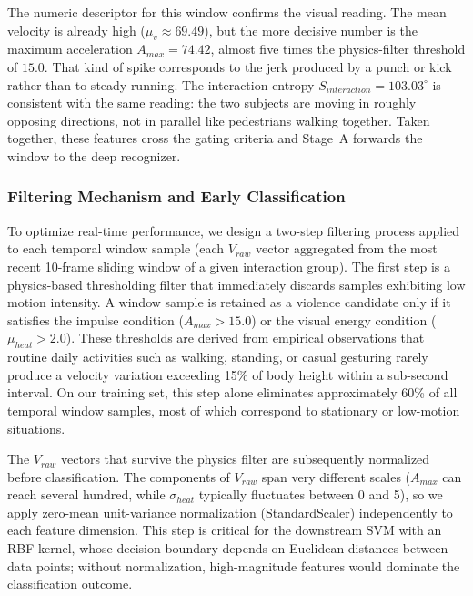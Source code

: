 \documentclass[conference]{IEEEtran}
\begin{document}
The numeric descriptor for this window confirms the visual reading. The mean velocity is already high ($\mu_v \approx 69.49$), but the more decisive number is the maximum acceleration $A_{max} = 74.42$, almost five times the physics-filter threshold of $15.0$. That kind of spike corresponds to the jerk produced by a punch or kick rather than to steady running. The interaction entropy $S_{interaction} = 103.03^\circ$ is consistent with the same reading: the two subjects are moving in roughly opposing directions, not in parallel like pedestrians walking together. Taken together, these features cross the gating criteria and Stage~A forwards the window to the deep recognizer.


\subsubsection{Filtering Mechanism and Early Classification}

To optimize real-time performance, we design a two-step filtering process applied to each temporal window sample (each $V_{raw}$ vector aggregated from the most recent 10-frame sliding window of a given interaction group). The first step is a physics-based thresholding filter that immediately discards samples exhibiting low motion intensity. A window sample is retained as a violence candidate only if it satisfies the impulse condition ($A_{max} > 15.0$) or the visual energy condition ($\mu_{heat} > 2.0$). These thresholds are derived from empirical observations that routine daily activities such as walking, standing, or casual gesturing rarely produce a velocity variation exceeding 15\% of body height within a sub-second interval. On our training set, this step alone eliminates approximately 60\%
of all temporal window samples, most of which correspond to stationary or low-motion situations.

The $V_{raw}$ vectors that survive the physics filter are subsequently normalized before classification. The components of $V_{raw}$ span very different scales ($A_{max}$ can reach several hundred, while $\sigma_{heat}$ typically fluctuates between 0 and 5), so we apply zero-mean unit-variance normalization (StandardScaler) independently to each feature dimension. This step is critical for the downstream SVM with an RBF kernel, whose decision boundary depends on Euclidean distances between data points; without normalization, high-magnitude features would dominate the classification outcome.
\end{document}
